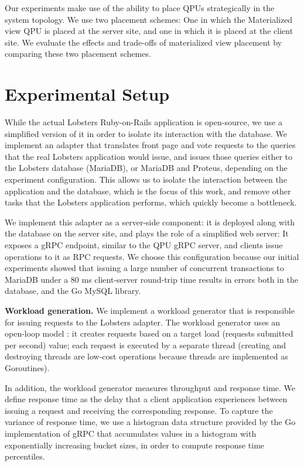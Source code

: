 Our experiments  make use of the ability to place QPUs strategically in the system topology.
We use two placement schemes:
One in which the Materialized view QPU is placed at the server site, and one in which it is placed at
the client site.
We evaluate the effects and trade-offs of materialized view placement by comparing these two placement schemes.


\section{Experimental Setup}
\label{sec:eval_setup}

While the actual Lobsters Ruby-on-Rails application is open-source,
we use a simplified version of it in order to isolate its interaction with the database.
We implement an adapter that translates front page and vote requests to the queries that the real
Lobsters application would issue, and issues those queries either to the Lobsters database (MariaDB),
or MariaDB and Proteus, depending on the experiment configuration.
This allows us to isolate the interaction between the application and the database, which is the focus of this work,
and remove other tasks that the Lobsters application performs, which quickly become a bottleneck.

We implement this adapter as a server-side component:
it is deployed along with the database on the server site, and plays the role of a simplified web server:
It exposes a gRPC endpoint, similar to the QPU gRPC server, and clients issue operations to it as RPC requests.
We choose this configuration because our initial experiments showed that issuing a large number of concurrent transactions
to MariaDB under a 80 ms client-server round-trip time results in errors both in the database,
and the Go MySQL library.

\bigskip
\noindent
\textbf{Workload generation.}
We implement a workload generator \cite{lobsters:bench} that is responsible for issuing
requests to the Lobsters adapter.
The workload generator uses an open-loop model \cite{schroeder:cautionarytale}:
it creates requests based on a target load (requests submitted per second) value;
each request is executed by a separate thread (creating and destroying threads are low-cost operations because threads are
implemented as Goroutines).

In addition, the workload generator measures throughput and response time.
We define response time as the delay that a client application experiences between issuing a request and receiving the
corresponding response.
To capture the variance of response time, we use a histogram data structure provided by the Go implementation of gRPC \cite{grpcgo:histogram}
that accumulates values in a histogram with exponentially increasing bucket sizes, in order to compute response time percentiles.

